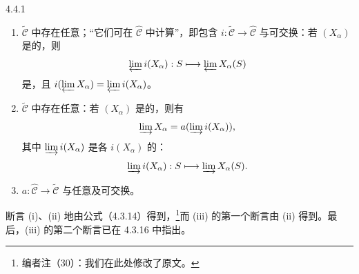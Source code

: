 \begin{SGAresult}{}{4.4.1}
\begin{enumerate}
\item[(i)] $\widetilde{\mathcal C}$ 中存在任意；“它们可在 $\widehat{\mathcal C}$ 中计算”，即包含 $i:\widetilde{\mathcal C}\to\widehat{\mathcal C}$ 与可交换：若 $(X_\alpha)$ 是的，则
\[
\varprojlim i(X_\alpha):S\longmapsto\varprojlim X_\alpha(S)
\]
是，且 $i(\varprojlim X_\alpha)=\varprojlim i(X_\alpha)$。
\item[(ii)] $\widetilde{\mathcal C}$ 中存在任意：若 $(X_\alpha)$ 是的，则有
\[
\varinjlim X_\alpha=a(\varinjlim i(X_\alpha)),
\]
其中 $\varinjlim i(X_\alpha)$ 是各 $i(X_\alpha)$ 的：
\[
\varinjlim i(X_\alpha):S\longmapsto\varinjlim X_\alpha(S).
\]
\item[(iii)]  $a:\widehat{\mathcal C}\to\widetilde{\mathcal C}$ 与任意及可交换。
\end{enumerate}
\end{SGAresult}
断言 (i)、(ii) 地由公式（4.3.14）得到，\footnote{编者注（30）：我们在此处修改了原文。}而 (iii) 的第一个断言由 (ii) 得到。最后，(iii) 的第二个断言已在 4.3.16 中指出。

